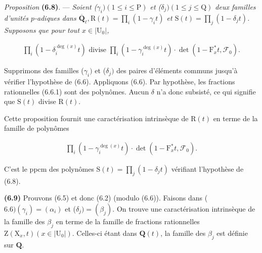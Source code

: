 \documentclass[10pt,leqno]{article}
\begin{document}
\noindent \emph{Proposition} \textbf{(6.8)}. — {\itshape Soient (\(\gamma _{i}) (1\leq i\leq \mathrm{P})\) et (\(\delta _{j}) (1\leq j\leq \mathrm{Q})\) deux familles d’unités \(p\)-adiques dans \(\overline{\mathbf{Q}}_{\ell }, \mathrm{R}(t)=\prod _{i}(1- \gamma _{i} t)\) et \(\mathrm{S}(t)=\prod _{j}(1- \delta _{j} t)\). Supposons que pour tout \(x\in |\mathrm{U}_{0}|\),}\par

\begin{equation*}\begin{gathered}\prod _{i}(1- \delta _{i}^{\operatorname{deg}(x)}t)\text{ divise }\prod _{i}(1- \gamma _{i}^{\operatorname{deg}(x)}t)\cdot \operatorname{det}(1- \mathrm{F}_{x}^{*}t,\mathcal{F} _{0}).\end{gathered}\end{equation*}

\par

\noindent Supprimons des familles (\(\gamma _{i})\) et (\(\delta _{j})\) des paires d’éléments communs jusqu’à vérifier l’hypothèse de (6.6). Appliquons (6.6). Par hypothèse, les fractions rationnelles (6.6.1) sont des polynômes. Aucun \(\delta \) n’a donc subsisté, ce qui signifie que \(\mathrm{S}(t)\) divise \(\mathrm{R}(t)\).\par

\noindent Cette proposition fournit une caractérisation intrinsèque de \(\mathrm{R}(t)\) en terme de la famille de polynômes\par

\begin{equation*}\begin{gathered}\prod _{i}(1- \gamma _{i}^{\operatorname{deg}(x)}t)\cdot \operatorname{det}(1- \mathrm{F}_{x}^{*}t,\mathcal{F} _{0}).\end{gathered}\end{equation*}

\noindent C’est le ppcm des polynômes \(\mathrm{S}(t)=\prod _{j}(1- \delta _{j} t)\) vérifiant l’hypothèse de (6.8).\par

\noindent \textbf{(6.9)} Prouvons (6.5) et donc (6.2) (modulo (6.6)). Faisons dans (\(6.6) (\gamma _{i})=(\alpha _{i})\) et (\(\delta _{j})=(\beta _{j})\). On trouve une caractérisation intrinsèque de la famille des \(\beta _{j}\) en terme de la famille de fractions rationnelles \(\mathrm{Z}(\mathrm{X}_{x},t) (x\in |\mathrm{U}_{0}|)\). Celles-ci étant dans \(\mathbf{Q}(t)\), la famille des \(\beta _{j}\) est définie sur \(\mathbf{Q}\).\par
\end{document}
